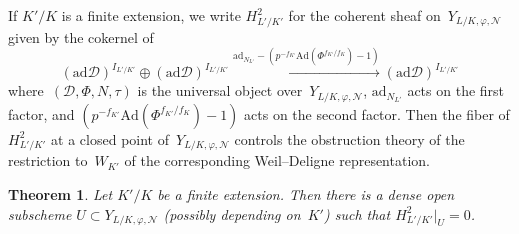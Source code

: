 \documentclass{amsart}
\def\Ad{\mathrm{Ad}}
\def\ad{\mathrm{ad}}
\newtheorem{thm}[subsubsection]{Theorem}
\theoremstyle{definition}
\theoremstyle{remark}
\newcommand{\mar}[1]{}
\newcommand{\mar}[1]{\marginpar{\raggedright\tiny squirrel #1}}
\begin{document}
If $K'/K$ is a finite extension, we write $H^2_{L'/K'}$ for the
coherent sheaf on~$Y_{L/K,\varphi,\mathcal N}$ given by the cokernel of  \[
  (\ad \mathcal D)^{I_{L'/K'}}\oplus(\ad
  \mathcal D)^{I_{L'/K'}}\xrightarrow{\ad_{N_{L'}}-(p^{-f_{K'}}\Ad(\Phi^{f_{K'}/f_K})-1)}(\ad
  \mathcal D)^{I_{L'/K'}}	\]
where~$(\mathcal D,\Phi,N,\tau)$ is the universal
object over~$Y_{L/K,\varphi,\mathcal N}$, $\ad_{N_{L'}}$ acts on the first factor, and $(p^{-f_{K'}}\Ad(\Phi^{f_{K'}/f_K})-1)$ acts on the second factor. %
Then the fiber of $H^2_{L'/K'}$ at a closed point of~$Y_{L/K,\varphi,\mathcal N}$ controls the obstruction theory of the
restriction to~$W_{K'}$ of the corresponding Weil--Deligne representation.
\begin{thm}\label{thm: very smooth points exist for Y}Let $K'/K$ be a
  finite extension. Then there is a dense open subscheme $U\subset
  Y_{L/K,\varphi,\mathcal N}$ \emph{(}possibly depending on~$K'$\emph{)} such that
  $H^2_{L'/K'}|_U=0$.%
  \end{thm}
\end{document}
